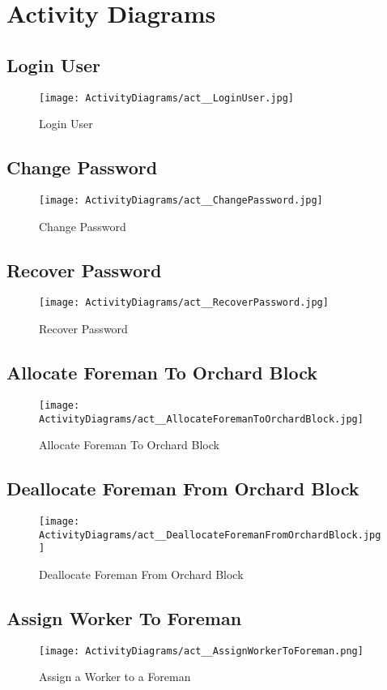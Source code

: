 \documentclass[11pt,fleqn]{book} %
\begin{document}
\section{Activity Diagrams}
\subsection{Login User}
\begin{figure}
	\texttt{[image: ActivityDiagrams/act\_\_LoginUser.jpg]}
	\caption{Login User}
\end{figure}

\subsection{Change Password}
\begin{figure}
	\texttt{[image: ActivityDiagrams/act\_\_ChangePassword.jpg]}
	\caption{Change Password}
\end{figure}

\subsection{Recover Password}
\begin{figure}
	\texttt{[image: ActivityDiagrams/act\_\_RecoverPassword.jpg]}
	\caption{Recover Password}
\end{figure}

\subsection{Allocate Foreman To Orchard Block}
\begin{figure}
	\texttt{[image: ActivityDiagrams/act\_\_AllocateForemanToOrchardBlock.jpg]}
	\caption{Allocate Foreman To Orchard Block}
\end{figure}

\subsection{Deallocate Foreman From Orchard Block}
\begin{figure}
	\texttt{[image: ActivityDiagrams/act\_\_DeallocateForemanFromOrchardBlock.jpg]}
	\caption{Deallocate Foreman From Orchard Block}
\end{figure}

\subsection{Assign Worker To Foreman}
\begin{figure}
	\texttt{[image: ActivityDiagrams/act\_\_AssignWorkerToForeman.png]}
	\caption{Assign a Worker to a Foreman}
\end{figure}
\end{document}
